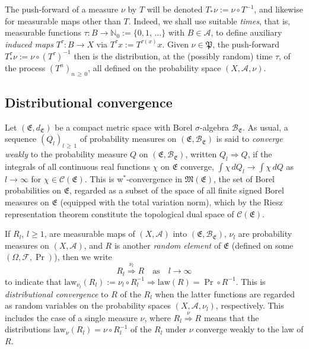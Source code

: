 \documentclass[AHL,Unicode,longabstracts]{cedram}
\newcommand{\clA}{\mathcal{A}}
\newcommand{\clC}{\mathcal{C}}
\newcommand{\clB}{\mathcal{B}}
\newcommand{\clF}{\mathcal{F}}
\newcommand{\law}{\mathrm{law}}
\newcommand{\frkP}{\mathfrak{P}}
\newcommand{\frkE}{\mathfrak{E}}
\newcommand{\frkM}{\mathfrak{M}}
\newcommand{\bbN}{\mathbb{N}}
\begin{document}
The push-forward of a measure $\nu$ by $T$ will be denoted $T_{\ast}\nu :=\nu\circ T^{-1}$, and likewise for measurable maps other than $T$. Indeed, we shall use suitable \emph{times}, that is, measurable functions $\tau:B\rightarrow\bbN_{0}:=\{0,1,\,\ldots\}$ with $B\in\clA$, to define auxiliary \emph{induced maps} $T^{\tau}:B\rightarrow X$ via $T^{\tau }x:=T^{\tau(x)}x$. Given $\nu\in\frkP$, the push-forward $T_{\ast }^{\tau}\nu:=\nu\circ(T^{\tau})^{-1}$ then is the distribution, at the (possibly random) time $\tau$, of the process $(T^{n})_{n\,\geq\,0}$, all defined on the probability space $(X,\clA,\nu)$.


\subsection{Distributional convergence}
Let $(\frkE,d_{\frkE})$ be a compact metric space with Borel $\sigma$-algebra $\clB_{\frkE }$. As usual, a sequence $(Q_{l})_{l\,\geq\,1}$ of probability measures on $(\frkE,\clB_{\frkE})$ is said to \emph{converge weakly} to the probability measure $Q$ on $(\frkE,\clB_{\frkE})$, written $Q_{l}\Longrightarrow Q$, if the integrals of all continuous real functions $\chi$ on $\frkE$ converge, $\int\chi\,dQ_{l}\longrightarrow \int\chi\,dQ$ as $l\rightarrow\infty$ for $\chi\in\clC(\frkE)$. This is w$^{\ast}$-convergence in $\frkM(\frkE)$, the set of Borel probabilities on $\frkE$, regarded as a subset of the space of all finite signed Borel measures on $\frkE$ (equipped with the total variation norm), which by the Riesz representation theorem constitute the topological dual space of $\clC(\frkE)$.

If $R_{l}$, $l\geq1$, are measurable maps of $(X,\clA)$ into $(\frkE,\clB_{\frkE})$, $\nu_{l}$ are probability measures on $(X,\clA)$, and $R$ is another \emph{random element} of $\frkE$ (defined on some $(\Omega,\clF,\Pr)$), then we write
\begin{equation}\label{Eq_NotationDistrCgeSeqMeas}
R_{l}\overset{\nu_{l}}{\Longrightarrow}R\quad\text{as}\quad l\rightarrow\infty
\end{equation}
to indicate that $\law_{\nu_{l}}(R_{l}):=\nu_{l}\circ R_{l} ^{-1}\Longrightarrow\law(R)=\Pr\circ R^{-1}$. This is
\emph{distributional convergence} to $R$ of the $R_{l}$ when the latter functions are regarded as random variables on the probability spaces $(X,\clA,\nu_{l})$, respectively. This includes the case of a single measure $\nu$, where $R_{l}\overset{\nu}{\Longrightarrow}R$ means that the distributions $\law_{\nu}(R_{l})=\nu\circ R_{l}^{-1}$ of the $R_{l}$ under $\nu$ converge weakly to the law of $R$.
\end{document}
